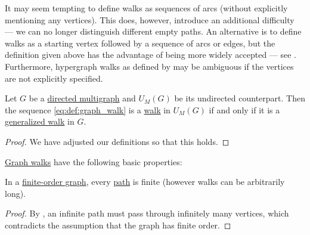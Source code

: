 \begin{comments}
  \item It may seem tempting to define walks as sequences of arcs (without explicitly mentioning any vertices). This does, however, introduce an additional difficulty --- we can no longer distinguish different empty paths. An alternative is to define walks as a starting vertex followed by a sequence of arcs or edges, but the definition given above has the advantage of being more widely accepted --- see . Furthermore, hypergraph walks as defined by \cite[300]{Емеличев1990} may be ambiguous if the vertices are not explicitly specified.
\end{comments}

\begin{proposition}\label{thm:walk_in_undirected_counterpart}
  Let \( G \) be a \hyperref[def:directed_multigraph]{directed multigraph} and \( \hyperref[def:graph_functors/multi_forgetful]{U_M}(G) \) be its undirected counterpart. Then the sequence \eqref{eq:def:graph_walk} is a \hyperref[def:graph_walk/undirected]{walk} in \( \hyperref[def:graph_functors/multi_forgetful]{U_M}(G) \) if and only if it is a \hyperref[def:graph_walk/generalized]{generalized walk} in \( G \).
\end{proposition}
\begin{proof}
  We have adjusted our definitions so that this holds.
\end{proof}

\begin{proposition}\label{thm:def:graph_walk}
  \hyperref[def:graph_walk]{Graph walks} have the following basic properties:
  \begin{thmenum}
     In a \hyperref[def:graph_cardinality/order]{finite-order graph}, every \hyperref[def:graph_walk/path]{path} is finite (however walks can be arbitrarily long).
  \end{thmenum}
\end{proposition}
\begin{proof}
   By , an infinite path must pass through infinitely many vertices, which contradicts the assumption that the graph has finite order.
\end{proof}


